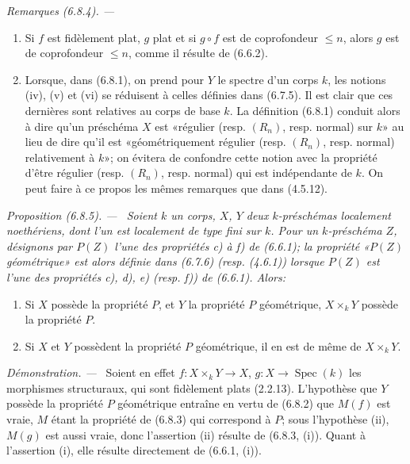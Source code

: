 \documentclass[10pt,oneside]{book}
\newenvironment{proposition}[1][]{%
  \par\medskip\noindent\itshape Proposition (#1). ---\ }{\par}
\newenvironment{remarks}[1][]{%
  \par\medskip\noindent\itshape Remarques (#1). ---\ }{\par}
\newenvironment{proof}{%
  \par\medskip\noindent\textit{Démonstration. ---\ }}{\par}
\begin{document}
\begin{remarks}[6.8.4]
\label{IV.2.s6.8.4-fr}
\begin{enumerate}
\item[(i)] Si $f$ est fidèlement plat, $g$ plat et si $g\circ f$ est de
coprofondeur $\leq n$, alors $g$ est de coprofondeur $\leq n$, comme il
résulte de (6.6.2).
\item[(ii)] Lorsque, dans (6.8.1), on prend pour $Y$ le spectre d'un corps
$k$, les notions (iv), (v) et (vi) se réduisent à celles définies dans (6.7.5).
Il est clair que ces dernières sont relatives au corps de base $k$. La
définition (6.8.1) conduit alors à dire qu'un préschéma $X$ est «régulier
(resp. $(R_n)$, resp. normal) sur $k$» au lieu de dire qu'il est
«géométriquement régulier (resp. $(R_n)$, resp. normal) relativement à $k$»;
on évitera de confondre cette notion avec la propriété d'être régulier (resp.
$(R_n)$, resp. normal) qui est indépendante de $k$. On peut faire à ce propos
les mêmes remarques que dans (4.5.12).
\end{enumerate}
\end{remarks}

\begin{proposition}[6.8.5]
\label{IV.2.s6.8.5-fr}
Soient $k$ un corps, $X$, $Y$ deux $k$-préschémas localement noethériens,
dont l'un est localement de type fini sur $k$. Pour un $k$-préschéma $Z$,
désignons par $P(Z)$ l'une des propriétés c) à f) de (6.6.1); la propriété
«$P(Z)$ géométrique» est alors définie dans (6.7.6) (resp. (4.6.1)) lorsque
$P(Z)$ est l'une des propriétés c), d), e) (resp. f)) de (6.6.1). Alors:
\begin{enumerate}
\item[(i)] Si $X$ possède la propriété $P$, et $Y$ la propriété $P$
géométrique, $X\times_kY$ possède la propriété $P$.
\item[(ii)] Si $X$ et $Y$ possèdent la propriété $P$ géométrique, il en est
de même de $X\times_kY$.
\end{enumerate}
\end{proposition}

\begin{proof}
Soient en effet $f:X\times_kY\to X$, $g:X\to\operatorname{Spec}(k)$ les
morphismes structuraux, qui sont fidèlement plats (2.2.13). L'hypothèse que
$Y$ possède la propriété $P$ géométrique entraîne en vertu de (6.8.2) que
$M(f)$ est vraie, $M$ étant la propriété de (6.8.3) qui correspond à $P$; sous
l'hypothèse (ii), $M(g)$ est aussi vraie, donc l'assertion (ii) résulte de
(6.8.3, (i)). Quant à l'assertion (i), elle résulte directement de (6.6.1, (i)).
\end{proof}
\end{document}
